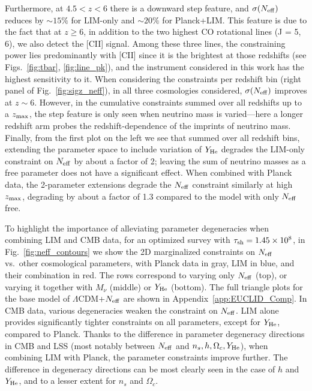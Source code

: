\documentclass[twocolumn]{aastex631}
\begin{document}
Furthermore, at $ 4.5<z<6$ there is a downward step feature, and $\sigma(N_{\rm eff})$ reduces by $\sim 15\%$ for LIM-only and $\sim 20\%$ for Planck+LIM. This feature is due to the fact that at $z \geq 6$, in addition to the two highest CO rotational lines (J = 5, 6), we also detect the [CII] signal. Among these three lines, the constraining power lies predominantly with [CII] since it is the brightest at those redshifts (see Figs.~\ref{fig:tbar}, \ref{fig:line_pk}), and the instrument considered in this work has the highest sensitivity to it. When considering the constraints per redshift bin (right panel of Fig.~\ref{fig:sigz_neff}), in all three cosmologies considered, $\sigma(N_{\rm eff})$ improves at $z\sim6$. However, in the cumulative constraints summed over all redshifts up to a $z_{\rm max}$, the step feature is only seen when neutrino mass is varied---here a longer redshift arm probes the redshift-dependence of the imprints of neutrino mass. Finally, from the first plot on the left we see that summed over all redshift bins, extending the parameter space to include variation of $Y_{\rm He}$ degrades the LIM-only constraint on $N_{\rm eff}$ by about a factor of 2; leaving the sum of neutrino masses as a free parameter does not have a significant effect. When combined with Planck data, the 2-parameter extensions degrade the $N_{\rm eff}$ constraint similarly at high $z_{\rm max}$, degrading by about a factor of 1.3 compared to the model with only $N_{\rm eff}$ free. 

To highlight the importance of alleviating parameter degeneracies when combining LIM and CMB data, for an optimized survey with $\tau_{\rm sh} =1.45\times10^8$, in Fig.~\ref{fig:neff_contours} we show the 2D marginalized constraints on $N_{\rm eff}$ vs.\ other cosmological parameters, with Planck data in gray, LIM in blue, and their combination in red. The rows correspond to varying only $N_{\rm eff}$ (top), or varying it together with $M_\nu$ (middle) or $Y_{\rm He}$ (bottom). The full triangle plots for the base model of $\Lambda$CDM+$N_{\rm eff}$ are shown in Appendix~\ref{app:EUCLID_Comp}. In CMB data, various degeneracies weaken the constraint on $N_{\rm eff}$. LIM alone provides significantly tighter constraints on all parameters, except for $Y_{\rm He}$, compared to Planck. Thanks to the difference in parameter degeneracy directions in CMB and LSS (most notably between $N_{\rm eff}$ and $n_s, h,\Omega_c, Y_{\rm He}$), when combining LIM with Planck, the parameter constraints improve further. The difference in degeneracy directions can be most clearly seen in the case of $h$ and $Y_{\rm He}$, and to a lesser extent for $n_s$ and $\Omega_c$.
\end{document}
